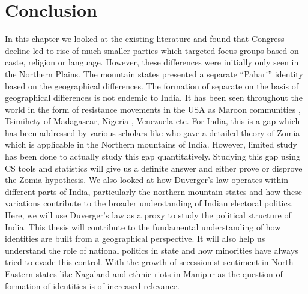 \begin{sloppypar}
 \section{Conclusion}

 In this chapter we looked at the existing literature and found that Congress decline led to rise of much smaller parties which targeted focus groups based on caste, religion or language. However, these differences were initially only seen in the Northern Plains. The mountain states presented a separate ``Pahari'' identity based on the geographical differences. The formation of separate on the basis of geographical differences is not endemic to India. It has been seen throughout the world in the form of resistance movements in the USA as Maroon communities \citep{price2020rainforest}, Tsimihety of Madagascar, Nigeria , Venezuela etc. For India, this is a gap which has been addressed by various scholars like \cite{scott2005civilizations} who gave a detailed theory of Zomia which is applicable in the Northern mountains of India. However, limited study has been done to actually study this gap quantitatively. Studying this gap using CS tools and statistics will give us a definite answer and either prove or disprove the Zomia hypothesis. We also looked at how Duverger's law operates within different parts of India, particularly the northern mountain states and how these variations contribute to the broader understanding of Indian electoral politics. Here, we will use Duverger's law as a proxy to study the political structure of India. This thesis will contribute to the fundamental understanding of how identities are built from a geographical perspective. It will also help us understand the role of national politics in state and how minorities have always tried to evade this control. With the growth of secessionist sentiment in North Eastern states like Nagaland and ethnic riots in Manipur as the question of formation of identities is of increased relevance.

\end{sloppypar}